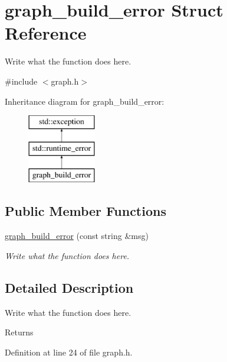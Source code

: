 \hypertarget{structgraph__build__error}{\section{graph\+\_\+build\+\_\+error Struct Reference}
\label{structgraph__build__error}
}


Write what the function does here.  




{\ttfamily \#include $<$graph.\+h$>$}

Inheritance diagram for graph\+\_\+build\+\_\+error\+:\begin{figure}[H]
\begin{center}
\leavevmode
\includegraphics[height=3.000000cm]{structgraph__build__error}
\end{center}
\end{figure}
\subsection*{Public Member Functions}
\begin{DoxyCompactItemize}
\item 
\hyperlink{structgraph__build__error_a5b6da9f94efcd703d99c2617381749c1}{graph\+\_\+build\+\_\+error} (const string \&msg)
\begin{DoxyCompactList}\small\item\em Write what the function does here. \end{DoxyCompactList}\end{DoxyCompactItemize}


\subsection{Detailed Description}
Write what the function does here. 

\begin{DoxyReturn}{Returns}

\end{DoxyReturn}


Definition at line 24 of file graph.\+h.



